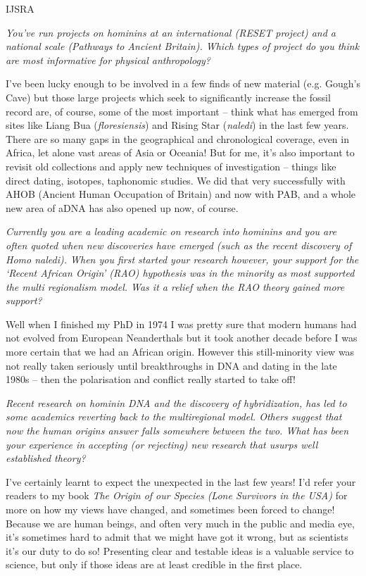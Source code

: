 \begin{labeling}{IJSRA}
\item[IJSRA]
\emph{You’ve run projects on hominins at an international (RESET project) and a national scale (Pathways to Ancient Britain).
Which types of project do you think are most informative for physical anthropology?}

\item[CS]
I’ve been lucky enough to be involved in a few finds of new material (e.g. Gough’s Cave) but
those large projects which seek to significantly increase the fossil record are, of course,
some of the most important – think what has emerged from sites like Liang Bua (\emph{floresiensis}) and Rising Star (\emph{naledi})
in the last few years. 
There are so many gaps in the geographical and chronological coverage, even in Africa, let alone vast areas of Asia or Oceania!
But for me, it’s also important to revisit old collections and apply new techniques of investigation – things like direct dating,
isotopes, taphonomic studies. 
We did that very successfully with AHOB (Ancient Human Occupation of Britain) and now with PAB,
and a whole new area of aDNA has also opened up now, of course.

\item[IJSRA]
\emph{Currently you are a leading academic on research into hominins and you are often quoted when new discoveries
have emerged (such as the recent discovery of \emph{Homo naledi}). When you first started your research however,
your support for the ‘Recent African Origin’ (RAO) hypothesis was in the minority as most supported the multi regionalism model.
Was it a relief when the RAO theory gained more support?}

\item[CS]
Well when I finished my PhD in 1974 I was pretty sure that modern humans had not evolved from European Neanderthals but
it took another decade before I was more certain that we had an African origin.
However this still-minority view was not really taken seriously until breakthroughs in DNA and dating in the late
1980s – then the polarisation and conflict really started to take off!

\item[IJSRA]
\emph{Recent research on hominin DNA and the discovery of hybridization, has led to some academics reverting back to
the multiregional model. 
Others suggest that now the human origins answer falls somewhere between the two.
What has been your experience in accepting (or rejecting) new research that usurps well established theory?}

\item[CS]
I’ve certainly learnt to expect the unexpected in the last few years!
I’d refer your readers to my book \emph{The Origin of our Species (Lone Survivors in the USA)} for more on how my views have changed,
and sometimes been forced to change!
Because we are human beings, and often very much in the public and media eye, it’s sometimes hard to
admit that we might have got it wrong, but as scientists it’s our duty to do so!
Presenting clear and testable ideas is a valuable service to science, but only if those ideas are at least credible in the first place.


\end{labeling}
